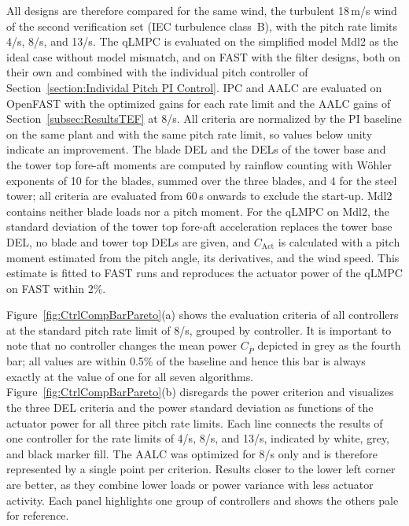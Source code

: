All designs are therefore compared for the same wind, the turbulent 18\,m/s wind of the
second verification set (IEC turbulence class~B), with the pitch rate limits 4\textdegree/s,
8\textdegree/s, and 13\textdegree/s. The qLMPC is evaluated on the simplified model Mdl2 as the
ideal case without model mismatch, and on FAST with the filter designs, both on their own
and combined with the individual pitch controller of Section~\ref{section:Individal Pitch PI Control}.
IPC and AALC are evaluated on OpenFAST with the optimized gains for each rate limit and the
AALC gains of Section~\ref{subsec:ResultsTEF} at 8\textdegree/s. All criteria are normalized by the
PI baseline on the same plant and with the same pitch rate limit, so values below unity
indicate an improvement. The blade DEL and the DELs of the tower base and the tower top fore-aft moments are computed by
rainflow counting with W\"ohler exponents of 10 for the blades, summed over the three blades, and
4 for the steel tower; all criteria are evaluated from 60\,s onwards to exclude the start-up. Mdl2 contains neither blade loads nor a pitch moment. For the qLMPC on Mdl2, the standard deviation of the
tower top fore-aft acceleration replaces the tower base DEL, no blade and tower top DELs are given, and $C_\text{Act}$ is calculated with a pitch moment estimated from the pitch angle, its derivatives, and the wind
speed. This estimate is fitted to FAST runs and reproduces the actuator power of the qLMPC on
FAST within 2\%.

Figure~\ref{fig:CtrlCompBarPareto}(a) shows the evaluation criteria of all controllers at the standard
pitch rate limit of 8\textdegree/s, grouped by controller. It is important to note that no controller changes the mean power
$C_{\bar{P}}$ depicted in grey as the fourth bar; all values are within 0.5\% of the baseline and hence this bar is always exactly at the value of one for all seven algorithms. Figure~\ref{fig:CtrlCompBarPareto}(b) disregards the power criterion and visualizes the three DEL criteria and the power standard deviation as functions of the actuator power for all three pitch rate limits. Each line connects the
results of one controller for the rate limits of 4\textdegree/s, 8\textdegree/s, and 13\textdegree/s,
indicated by white, grey, and black marker fill. The AALC was optimized for 8\textdegree/s only and
is therefore represented by a single point per criterion. Results closer to the lower left corner
are better, as they combine lower loads or power variance with less actuator activity. Each panel
highlights one group of controllers and shows the others pale for reference.

